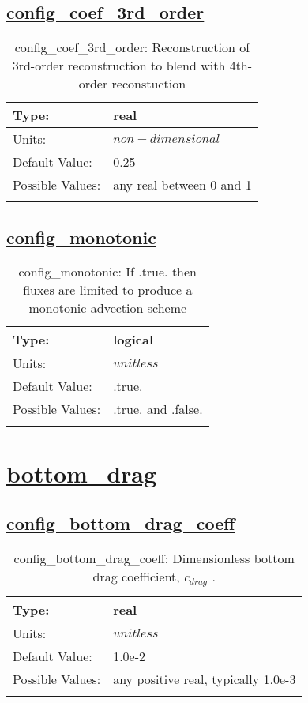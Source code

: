 \subsection[config\_coef\_3rd\_order]{\hyperref[sec:nm_tab_advection]{config\_coef\_3rd\_order}}
\label{subsec:nm_sec_config_coef_3rd_order}
\begin{center}
\begin{longtable}{| p{2.0in} | p{4.0in} |}
    \hline
    Type: & real \\
    \hline
    Units: & $non-dimensional$ \\
    \hline
    Default Value: & 0.25 \\
    \hline
    Possible Values: & any real between 0 and 1 \\
    \hline
    \caption{config\_coef\_3rd\_order: Reconstruction of 3rd-order reconstruction to blend with 4th-order reconstuction}
\end{longtable}
\end{center}
\subsection[config\_monotonic]{\hyperref[sec:nm_tab_advection]{config\_monotonic}}
\label{subsec:nm_sec_config_monotonic}
\begin{center}
\begin{longtable}{| p{2.0in} | p{4.0in} |}
    \hline
    Type: & logical \\
    \hline
    Units: & $unitless$ \\
    \hline
    Default Value: & .true. \\
    \hline
    Possible Values: & .true. and .false. \\
    \hline
    \caption{config\_monotonic: If .true. then fluxes are limited to produce a monotonic advection scheme}
\end{longtable}
\end{center}
\section[bottom\_drag]{\hyperref[sec:nm_tab_bottom_drag]{bottom\_drag}}
\label{sec:nm_sec_bottom_drag}
\subsection[config\_bottom\_drag\_coeff]{\hyperref[sec:nm_tab_bottom_drag]{config\_bottom\_drag\_coeff}}
\label{subsec:nm_sec_config_bottom_drag_coeff}
\begin{center}
\begin{longtable}{| p{2.0in} | p{4.0in} |}
    \hline
    Type: & real \\
    \hline
    Units: & $unitless$ \\
    \hline
    Default Value: & 1.0e-2 \\
    \hline
    Possible Values: & any positive real, typically 1.0e-3 \\
    \hline
    \caption{config\_bottom\_drag\_coeff:  Dimensionless bottom drag coefficient,  $c_{drag}$ .}
\end{longtable}
\end{center}
